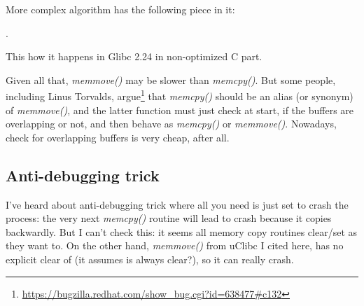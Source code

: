 More complex algorithm has the following piece in it:

.

This how it happens in Glibc 2.24 in non-optimized C part.

Given all that, \emph{memmove()} may be slower than \emph{memcpy()}.
But some people, including Linus Torvalds, argue\footnote{\url{https://bugzilla.redhat.com/show_bug.cgi?id=638477\#c132}}
that \emph{memcpy()} should be an alias (or synonym) of \emph{memmove()}, and the latter
function must just check at start, if the buffers are overlapping or not, and then behave as \emph{memcpy()} or \emph{memmove()}.
Nowadays, check for overlapping buffers is very cheap, after all.

\subsection{Anti-debugging trick}

I've heard about anti-debugging trick where all you need is just set  to crash the process: the very next \emph{memcpy()}
routine will lead to crash because it copies backwardly.
But I can't check this: it seems all memory copy routines clear/set  as they want to.
On the other hand, \emph{memmove()} from uClibc I cited here,
has no explicit clear of  (it assumes  is always clear?),
so it can really crash.


